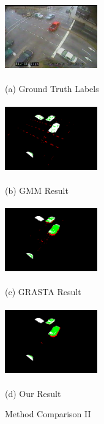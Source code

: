 \documentclass{article}
\begin{document}
\begin{figure}[t]
\centering
\begin{minipage}[b]{0.48\linewidth}
  \centering
  \centerline{\includegraphics[width=4cm, height=3cm]{Imgs/0412041242.jpg}}
  \centerline{(a) Ground Truth Labels}\medskip
\end{minipage}
\begin{minipage}[b]{0.48\linewidth}
  \centering
  \centerline{\includegraphics[width=4cm, height=3cm]{Imgs/0412041242_gmm_rwg.png}}
  \centerline{(b) GMM Result}\medskip
\end{minipage}

\begin{minipage}[b]{0.48\linewidth}
  \centering
  \centerline{\includegraphics[width=4cm, height =3cm]{Imgs/0412041242_grasta_rwg.png}}
  \centerline{(c) GRASTA Result}\medskip
\end{minipage}
\begin{minipage}[b]{0.48\linewidth}
  \centering
  \centerline{\includegraphics[width=4cm, height = 3cm]{Imgs/0412041242_rpca_rwg.png}}
  \centerline{(d) Our Result}\medskip
\end{minipage}

\caption{Method Comparison II}
\label{fig:methodComp2}
%
\end{figure}
\end{document}
